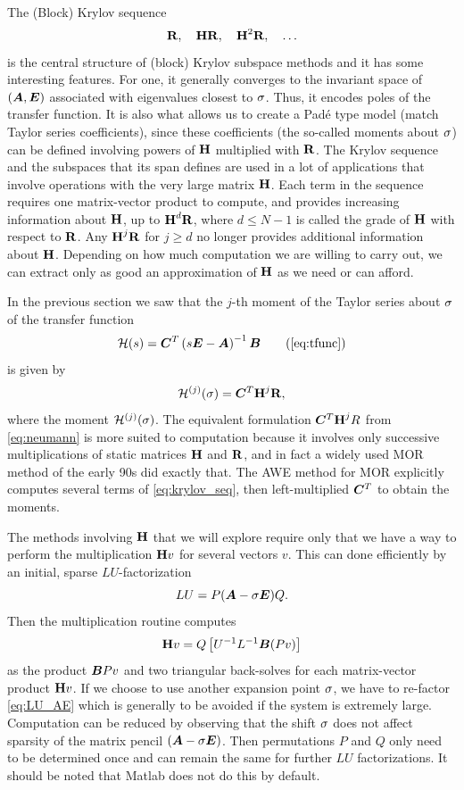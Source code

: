 \medskip   
The (Block) Krylov sequence 
 \begin{equation}
                \textbf{\textup{R}}, \quad\textbf{\textup{H}} \textbf{\textup{R}},\quad \textbf{\textup{H}}^2 \textbf{\textup{R}},\quad \ldots
        \label{eq:krylov_seq}
   \end{equation}
is the central structure of (block) Krylov subspace methods and it has some interesting features.   For one, it generally converges to the invariant space of  $(\bm{A},\bm{E})$ associated with eigenvalues closest to $\sigma$.    Thus, it encodes poles of the transfer function.  It is also what allows us to create a Pad\'e type model (match Taylor series coefficients), since these coefficients (the so-called moments about $\sigma$) can be defined involving powers of $\textbf{\textup{H}}$ multiplied with $\textbf{\textup{R}}$.  The Krylov sequence and the subspaces that its span defines are used in a lot of applications that involve operations with the very large matrix $\textbf{\textup{H}}$.  Each term in the sequence requires one matrix-vector product to compute, and provides increasing information about $\textbf{\textup{H}}$, up to $\textbf{\textup{H}}^d \textbf{\textup{R}}$, where $d\leq N-1$ is called the grade of $\textbf{\textup{H}}$ with respect to $\textbf{\textup{R}}$.  Any $\textbf{\textup{H}}^j \textbf{\textup{R}}$ for $j\geq d$ no longer provides additional information about $\textbf{\textup{H}}$.   Depending on how much computation we are willing to carry out, we can extract only as good an approximation of $\textbf{\textup{H}}$ as we need or can afford.     


In the previous section we saw that the $j$-th moment of the Taylor series about $\sigma$ of the transfer function
\[
\tf(s) = \CC^T\left(s\E-\A\right)^{-1}\BB \tag{\ref{eq:tfunc}}
\]
is given by 
\[ 
\mathcal{H}^{(j)}(\sigma)  = \bm{C}^T \textbf{\textup{H}}^j \textbf{\textup{R}},
\]  
where the moment $\mathcal{H}^{(j)}(\sigma)$.  The equivalent formulation $\bm{C}^T \textbf{\textup{H}}^j R$ from \eqref{eq:neumann} is more suited to computation because it involves only successive multiplications of static matrices $\textbf{\textup{H}}$ and $\textbf{\textup{R}}$, and in fact a widely used MOR method of the early 90s \cite{AWE} did exactly that.  The AWE method for MOR explicitly computes several terms of   \eqref{eq:krylov_seq}, then left-multiplied $\bm{C}^T$ to obtain the moments.  

  The methods involving $\textbf{\textup{H}}$ that we will explore require only that we have a way to perform the multiplication $\textbf{\textup{H}} v$ for several vectors $v$.  This can done efficiently by an initial, sparse $LU$-factorization 
\begin{equation}
LU = P (\bm{A} - \sigma \bm{E}) Q.
\label{eq:LU_AE}
\end{equation}
 Then the multiplication routine computes
\[
\textbf{\textup{H}} v = Q \left[ U^{-1}L^{-1} \bm{B} (Pv) \right]
\]
as the product $\bm{B} Pv$ and two triangular back-solves for each matrix-vector product $\textbf{\textup{H}} v$.   If we choose to use another expansion point $\sigma$, we have to re-factor \eqref{eq:LU_AE} which is generally to be avoided if the system is extremely large.  Computation can be reduced by observing that the shift $\sigma$ does not affect sparsity of the matrix pencil $(\bm{A}-\sigma \bm{E})$.  Then permutations $P$ and $Q$ only need to be determined once and can remain the same for further $LU$ factorizations.  It should be noted that Matlab does not do this by default.  


